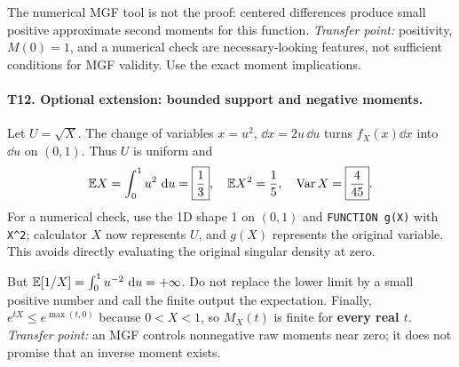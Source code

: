 The numerical MGF tool is not the proof: centered differences produce small positive approximate second moments for this function. \emph{Transfer point:} positivity, $M(0)=1$, and a numerical check are necessary-looking features, not sufficient conditions for MGF validity. Use the exact moment implications.

\paragraph{T12. Optional extension: bounded support and negative moments.}
Let $U=\sqrt X$. The change of variables $x=u^2$, $\dd x=2u\,\dd u$ turns $f_X(x)\dd x$ into $\dd u$ on $(0,1)$. Thus $U$ is uniform and
\[
\mathbb E X=\int_0^1u^2\,\,\mathrm d u=\boxed{\frac13},\quad
\mathbb E X^2=\frac15,\quad \operatorname{Var} X=\boxed{\frac4{45}}.
\]
For a numerical check, use the 1D shape 1 on $(0,1)$ and \texttt{FUNCTION g(X)} with \texttt{X\^{}2}; calculator $X$ now represents $U$, and $g(X)$ represents the original variable. This avoids directly evaluating the original singular density at zero.

But $\mathbb E[1/X]=\int_0^1u^{-2}\,\,\mathrm d u=+\infty$. Do not replace the lower limit by a small positive number and call the finite output the expectation. Finally, $e^{tX}\le e^{\max(t,0)}$ because $0<X<1$, so $M_X(t)$ is finite for \textbf{every real $t$}. \emph{Transfer point:} an MGF controls nonnegative raw moments near zero; it does not promise that an inverse moment exists.
